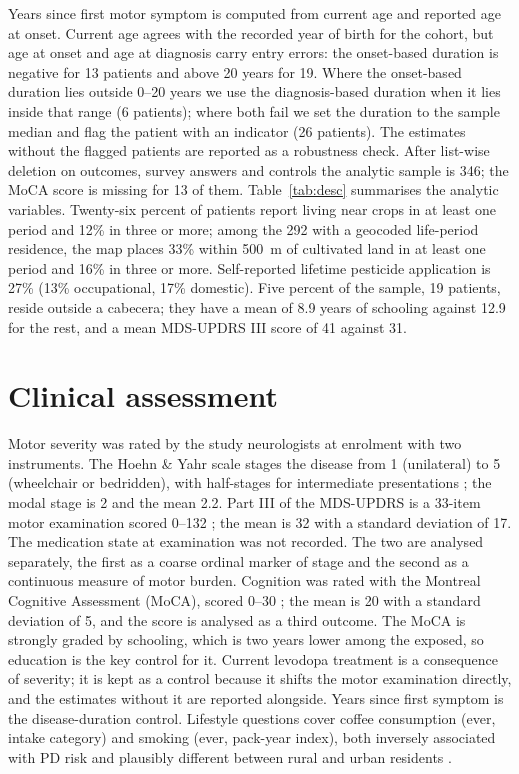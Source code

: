 \documentclass[11pt,a4paper]{article}
\begin{document}
Years since first motor symptom is computed from current age and reported age at onset. Current age agrees with the recorded year of birth for the cohort, but age at onset and age at diagnosis carry entry errors: the onset-based duration is negative for 13 patients and above 20 years for 19. Where the onset-based duration lies outside 0--20 years we use the diagnosis-based duration when it lies inside that range (6 patients); where both fail we set the duration to the sample median and flag the patient with an indicator (26 patients). The estimates without the flagged patients are reported as a robustness check. After list-wise deletion on outcomes, survey answers and controls the analytic sample is 346; the MoCA score is missing for 13 of them. Table~\ref{tab:desc} summarises the analytic variables. Twenty-six percent of patients report living near crops in at least one period and 12\% in three or more; among the 292 with a geocoded life-period residence, the map places 33\% within 500~m of cultivated land in at least one period and 16\% in three or more. Self-reported lifetime pesticide application is 27\% (13\% occupational, 17\% domestic). Five percent of the sample, 19 patients, reside outside a cabecera; they have a mean of 8.9 years of schooling against 12.9 for the rest, and a mean MDS-UPDRS III score of 41 against 31.

\begin{table}[H]\centering\footnotesize
\caption{Descriptive statistics, analytic sample}\label{tab:desc}

\end{table}

\section{Clinical assessment}

Motor severity was rated by the study neurologists at enrolment with two instruments. The Hoehn \& Yahr scale stages the disease from 1 (unilateral) to 5 (wheelchair or bedridden), with half-stages for intermediate presentations \citep{hoehn_parkinsonism_1967}; the modal stage is 2 and the mean 2.2. Part III of the MDS-UPDRS is a 33-item motor examination scored 0--132 \citep{goetz_movement_2008}; the mean is 32 with a standard deviation of 17. The medication state at examination was not recorded. The two are analysed separately, the first as a coarse ordinal marker of stage and the second as a continuous measure of motor burden. Cognition was rated with the Montreal Cognitive Assessment (MoCA), scored 0--30 \citep{nasreddine_montreal_2005}; the mean is 20 with a standard deviation of 5, and the score is analysed as a third outcome. The MoCA is strongly graded by schooling, which is two years lower among the exposed, so education is the key control for it. Current levodopa treatment is a consequence of severity; it is kept as a control because it shifts the motor examination directly, and the estimates without it are reported alongside. Years since first symptom is the disease-duration control. Lifestyle questions cover coffee consumption (ever, intake category) and smoking (ever, pack-year index), both inversely associated with PD risk and plausibly different between rural and urban residents \citep{hernan_meta-analysis_2002}.
\end{document}
